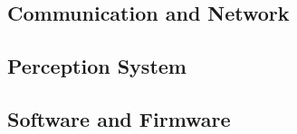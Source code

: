 \subsection{Communication and Network}\label{subsec:v2x-communication-and-network}
\subsection{Perception System}\label{subsec:perception-system}
\subsection{Software and Firmware}\label{subsec:software-and-firmware}
